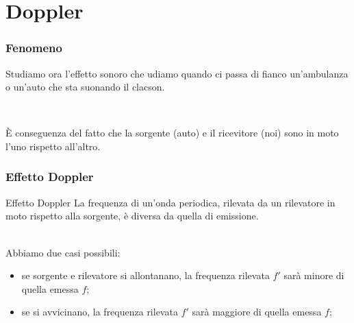 \documentclass[]{beamer}
\theoremstyle{plain}
\begin{document}
\section{Doppler}

\begin{frame}
\frametitle{Fenomeno}
Studiamo ora l'effetto sonoro che udiamo quando ci passa di fianco un'ambulanza o un'auto che sta suonando il clacson. \href{video/Dopplerauto.mp4}{}\pause

~

È conseguenza del fatto che la sorgente (auto) e il ricevitore (noi) sono \alert<2>{in moto l'uno rispetto all'altro}.

\end{frame}


\begin{frame}
\frametitle{Effetto Doppler}
\begin{block}{Effetto Doppler}
La frequenza di un'onda periodica, rilevata da un rilevatore in moto rispetto alla sorgente, è diversa da quella di emissione.
\end{block}\pause~\\

Abbiamo due casi possibili:
\begin{itemize}
  \item se sorgente e rilevatore \alert<2>{si allontanano}, la frequenza rilevata $ f' $ sarà \alert<2>{minore} di quella emessa $ f $;\pause
  \item se \alert<3>{si avvicinano}, la frequenza rilevata $ f' $ sarà \alert<3>{maggiore} di quella emessa $ f $;\pause
 \end{itemize}
\end{frame}
\end{document}
